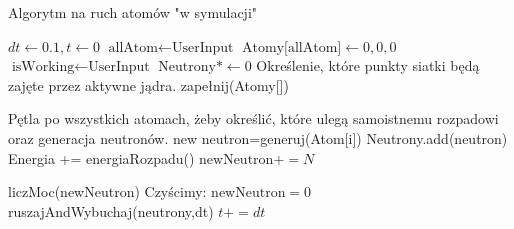\noindent
\begin{algorithm}
\caption{Algorytm na ruch atomów "w symulacji"}
\begin{algorithmic}[1]
\State $dt \gets 0.1, t \gets 0$
\State $\text{allAtom} \gets \text{UserInput}$
\State $\text{Atomy[allAtom]}\gets {0,0,0} $
\State $\text{isWorking}\gets \text{UserInput}$
\State $\text{Neutrony*}\gets 0$
\State Określenie, które punkty siatki będą zajęte przez aktywne jądra.
\State zapełnij(Atomy[])

    \State Pętla po wszystkich atomach, żeby określić, które ulegą samoistnemu rozpadowi oraz generacja neutronów.
            \State new neutron=generuj(Atom[i])
            \State Neutrony.add(neutron)
            \EndFor
            \State Energia += energiaRozpadu()
            \State $\text{newNeutron} += N$
        \EndIf
    
    \EndFor
    \State liczMoc(newNeutron)
    \State Czyścimy: $\text{newNeutron} =0$
    \State ruszajAndWybuchaj(neutrony,dt) 
    \State $t += dt$
    
\EndWhile

\end{algorithmic}
\end{algorithm}